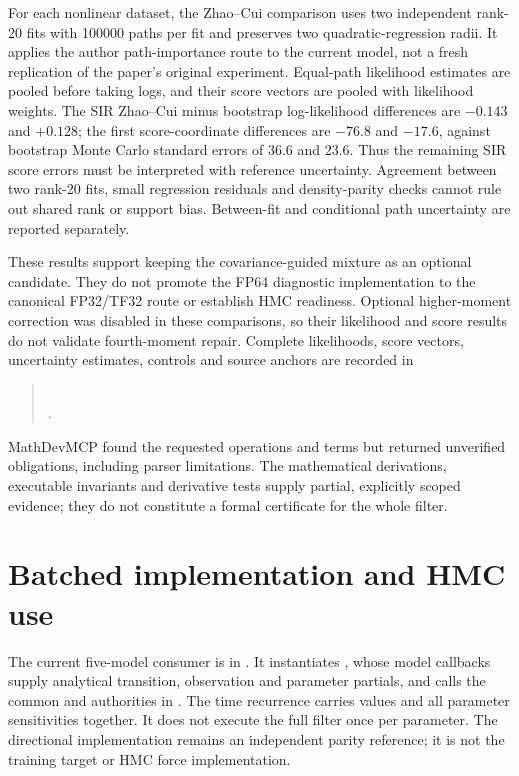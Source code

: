 For each nonlinear dataset, the Zhao--Cui comparison uses two independent
rank-20 fits with 100000 paths per fit and preserves two quadratic-regression
radii. It applies the author path-importance route to the current model, not a
fresh replication of the paper's original experiment. Equal-path likelihood
estimates are pooled before taking logs, and their score vectors are pooled with
likelihood weights. The SIR Zhao--Cui minus bootstrap log-likelihood differences
are \(-0.143\) and \(+0.128\); the first score-coordinate differences are
\(-76.8\) and \(-17.6\), against bootstrap Monte Carlo standard errors of
\(36.6\) and \(23.6\). Thus the remaining SIR score errors must be interpreted
with reference uncertainty. Agreement between two rank-20 fits, small
regression residuals and density-parity checks cannot rule out shared rank or
support bias. Between-fit and conditional path uncertainty are reported
separately.

These results support keeping the covariance-guided mixture as an optional
candidate. They do not promote the FP64 diagnostic implementation to the
canonical FP32/TF32 route or establish HMC readiness. Optional higher-moment
correction was disabled in these comparisons, so their likelihood and score
results do not validate fourth-moment repair. Complete likelihoods, score
vectors, uncertainty estimates, controls and source anchors are recorded in
\begin{quote}\small
{}\\
.
\end{quote}

MathDevMCP found the requested operations and terms but returned unverified
obligations, including parser limitations. The mathematical derivations,
executable invariants and derivative tests supply partial, explicitly scoped
evidence; they do not constitute a formal certificate for the whole filter.


\section{Batched implementation and HMC use}
\label{sec:bf-covariance-proposal-current-code}

The current five-model consumer is
 in .
It instantiates , whose model callbacks supply analytical
transition, observation and parameter partials, and calls the common
 and  authorities in
. The time recurrence carries values and
all parameter sensitivities together. It does not execute the full filter once
per parameter. The directional implementation remains an independent parity
reference; it is not the training target or HMC force implementation.

